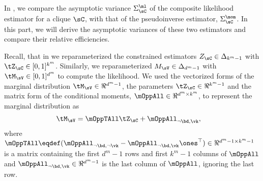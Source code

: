 \subsection{}
\label{app:pw-proof}

In , we compare the asymptotic variance
  $\Sigma^\ml_\sC$ of the composite likelihood estimator for a clique
  $\sC$, with that of the pseudoinverse estimator, $\Sigma^\mom_\sC$. 
In this part, we will derive the asymptotic variances of these two
  estimators and compare their relative efficiencies.

Recall, that in  we reparameterized the
  constrained estimators $Z_\sC \in \Delta_{k^m-1}$ with $\tZ_\sC \in
  [0,1]^{k^m}$. 
Similarly, we reparameterized $M_\sV \in \Delta_{d^m - 1}$ with
  $\tM_\sV \in [0,1]^{d^m}$ to compute
  the likelihood.
We used the vectorized forms of the marginal distribution $\tM_\sV \in
  \Re^{d^m - 1}$, the parameters $\tZ_\sC \in \Re^{k^m-1}$ and the
  matrix form of the conditional moments, $\mOppAll \in \Re^{d^m \times
  k^m}$, to represent the marginal distribution as
\begin{align*}
  \tM_\sV &= \mOppTAll \tZ_\sC + \mOppAll_{\neg \bd, \vk},
\end{align*}
where $\mOppTAll \eqdef (\mOppAll_{\neg \bd, \neg \vk}
- \mOppAll_{\neg \bd, \vk}\ones^\top) \in \Re^{d^m - 1 \times
k^m - 1}$ is a matrix containing the first $d^m-1$ rows and first $k^m-1$ columns of $\mOppAll$
and $\mOppAll_{\neg \bd, \vk} \in \Re^{d^m-1}$ is the last column of
$\mOppAll$, ignoring the last row.

